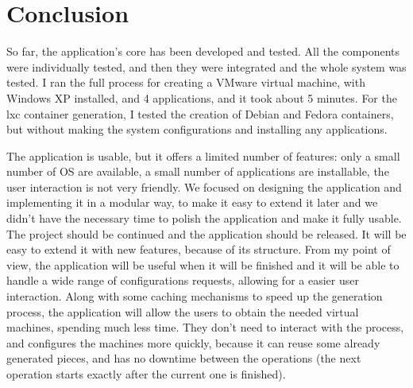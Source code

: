 \chapter{Conclusion}
\label{chapter:conclusions}
So far, the application's core has been developed and tested. All the
components were individually tested, and then they were integrated and the
whole system was tested. I ran the full process for creating a VMware virtual
machine, with Windows XP installed, and 4 applications, and it took about 5
minutes. For the lxc container generation, I tested the creation of Debian and
Fedora containers, but without making the system configurations and installing
any applications.

The application is usable, but it offers a limited number of features: only a
small number of OS are available, a small number of applications are
installable, the user interaction is not very friendly. We focused on designing
the application and implementing it in a modular way, to make it easy to extend
it later and we didn't have the necessary time to polish the application and
make it fully usable. The project should be continued and the application
should be released. It will be easy to extend it with new features, because of
its structure. From my point of view, the application will be useful when it
will be finished and it will be able to handle a wide range of configurations
requests, allowing for a easier user interaction. Along with some caching
mechanisms to speed up the generation process, the application will allow the
users to obtain the needed virtual machines, spending much less time. They
don't need to interact with the process, and \project configures the machines
more quickly, because it can reuse some already generated pieces, and has no
downtime between the operations (the next operation starts exactly after the
current one is finished).
